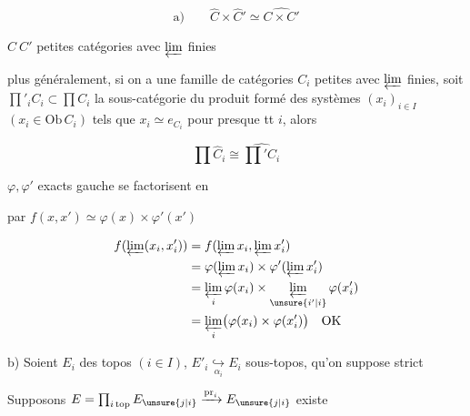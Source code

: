 \[
\text{a)}\qquad \widehat C\times\widehat C'\simeq\widehat{C\times C'}
\]

$C\ C'$ petites catégories avec $\varprojlim$ finies

plus généralement, si on a une famille de catégories $C_i$ petites avec $\varprojlim$ finies, soit $\prod'_i C_i\subset\prod C_i$ la sous-catégorie  du produit formé des systèmes $(x_i)_{i\in I}$ $(x_i\in\mathrm{Ob}\,C_i)$ tels que $x_i\simeq e_{C_i}$ pour presque tt $i$, alors

\[
\prod\widehat C_i\cong\widehat{\prod' C_i}
\]


$\varphi,\varphi'$ exacts  gauche  se factorisent en


par $f(x,x')\simeq\varphi(x)\times\varphi'(x')$

\[
\begin{aligned}
f(\varprojlim(x_i,x'_i))&=f(\varprojlim x_i,\varprojlim x'_i)\\
 &=\varphi(\varprojlim x_i)\times\varphi'(\varprojlim x'_i)\\
 &=\varprojlim_i\varphi(x_i)\times\varprojlim_{\unsure{i'|i}}\varphi(x'_i)\\
 &=\varprojlim_i\bigl(\varphi(x_i)\times\varphi(x'_i)\bigr)\quad\text{OK}
\end{aligned}
\]

b) Soient $E_i$ des topos $(i\in I)$, $E'_i\underset{\alpha_i}{\hookrightarrow}E_i$ sous-topos, qu'on  suppose strict

Supposons $E=\prod_{i\,\mathrm{top}}E_{\unsure{j|i}}\xrightarrow{\mathrm{pr}_i}E_{\unsure{j|i}}$ existe

